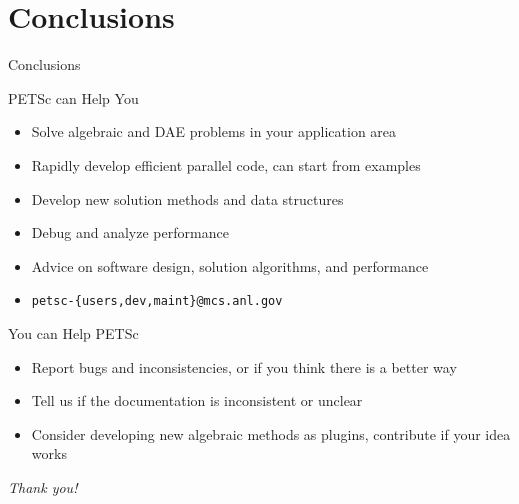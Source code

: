 \section{Conclusions}
\begin{frame}{Conclusions}
 
 \begin{block}{PETSc can Help You}
  \begin{itemize}
   \item Solve algebraic and DAE problems in your application area
   \item Rapidly develop efficient parallel code, can start from examples
   \item Develop new solution methods and data structures
   \item Debug and analyze performance
   \item Advice on software design, solution algorithms, and performance
   \item \centering \texttt{petsc-\{users,dev,maint\}@mcs.anl.gov}

  \end{itemize}
 \end{block}

 \begin{block}{You can Help PETSc}
  \begin{itemize}
   \item Report bugs and inconsistencies, or if you think there is a better way
   \item Tell us if the documentation is inconsistent or unclear
   \item Consider developing new algebraic methods as plugins, contribute if your idea works
  \end{itemize}
 \end{block}

   \begin{flushright}
   \textit{Thank you!}
  \end{flushright}

\end{frame}

